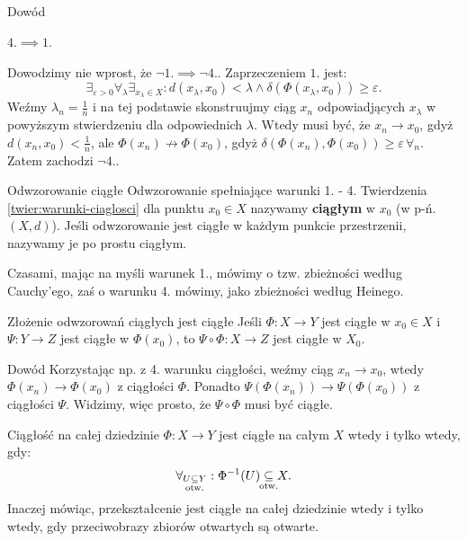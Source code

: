 \documentclass{article}
\numberwithin{defi}{section}
\numberwithin{theo}{section}
\numberwithin{defi}{section}
\newcommand{\eps}{\varepsilon}
\newcommand{\subotw}{\underset{\clap{\scriptsize otw.}}{\subseteq}}
\begin{document}
\begin{dow}{Dowód}
    \paragraph{$4. \implies 1.$} Dowodzimy nie wprost, że $\neg 1. \implies \neg 4.$. Zaprzeczeniem $1.$ jest: \begin{equation*}
        \exists_{\eps > 0} \forall_\lambda \exists_{x_\lambda \in X}: d(x_\lambda, x_0) < \lambda \wedge \delta( \Phi(x_\lambda, x_0)) \geqslant \eps.
    \end{equation*} Weźmy $\lambda_n = \frac{1}{n}$ i na tej podstawie skonstruujmy ciąg $x_n$ odpowiadjących $x_\lambda$ w powyższym stwierdzeniu dla odpowiednich $\lambda$. Wtedy musi być, że $x_n \to x_0$, gdyż $d(x_n, x_0) < \frac{1}{n}$, ale $\Phi(x_n) \nrightarrow \Phi(x_0)$, gdyż $\delta( \Phi(x_n), \Phi(x_0)) \geqslant \eps \, \forall_n$. Zatem zachodzi $\neg 4.$.

\end{dow}


    \begin{defr}{Odwzorowanie ciągłe}\label{defr:ciaglosc}
        Odwzorowanie spełniające warunki 1. - 4. Twierdzenia \ref{twier:warunki-ciaglosci} dla punktu $x_0 \in X$ nazywamy \textbf{ciągłym} w $x_0$ (w p-ń. $(X, d)$). Jeśli odwzorowanie jest ciągłe w każdym punkcie przestrzenii, nazywamy je po prostu ciągłym.
    \end{defr}
        Czasami, mając na myśli warunek 1., mówimy o tzw. zbieżności według Cauchy'ego, zaś o warunku 4. mówimy, jako zbieżności według Heinego.

    \begin{twier}{Złożenie odwzorowań ciągłych jest ciągłe}
        Jeśli $\Phi: X \to Y$ jest ciągłe w $x_0 \in X$ i $\Psi: Y \to Z$ jest ciągłe w $\Phi(x_0)$, to $\Psi \circ \Phi: X \to Z$ jest ciągłe w $X_0$.
    \end{twier}

    \begin{dow}{Dowód}
        Korzystając np. z 4. warunku ciągłości, weźmy ciąg $x_n \to x_0$, wtedy $\Phi(x_n) \to \Phi(x_0)$ z ciągłości $\Phi$. Ponadto $\Psi(\Phi(x_n)) \to \Psi(\Phi(x_0))$ z ciągłości $\Psi$. Widzimy, więc prosto, że $\Psi \circ \Phi$ musi być ciągłe.
    \end{dow}

    \begin{twier}{Ciągłość na całej dziedzinie}
        $\Phi: X \to Y$ jest ciągłe na całym $X$ wtedy i tylko wtedy, gdy: \begin{equation}
            \forall_{U \subotw Y}: \Phi^{-1}(U) \subotw X.
        \end{equation} Inaczej mówiąc, przekształcenie jest ciągłe na całej dziedzinie wtedy i tylko wtedy, gdy przeciwobrazy zbiorów otwartych są otwarte.
    \end{twier}
\end{document}
